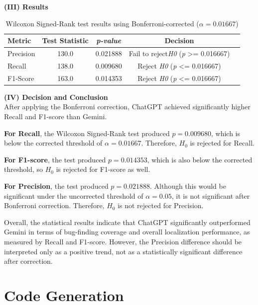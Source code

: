 \documentclass[11pt,a4paper]{article}
\begin{document}
    \textbf{(III) Results}\\

     \begin{table}[h]
        \centering
        \begin{tabular}{lcccc}
        \hline
        \textbf{Metric} & \textbf{Test Statistic} & \textbf{\textit{p-value}} & \textbf{Decision}\\
        \hline
        Precision &  130.0 &  0.021888  & Fail to reject\textit{H0} (\textit{p} >= 0.016667)\\
        Recall &  138.0 & 0.009680 & Reject \textit{H0} (\textit{p} <= 0.016667)\\
        F1-Score & 163.0 & 0.014353 & Reject \textit{H0} (\textit{p} <= 0.016667)\\
        \hline
        \end{tabular}
        \caption{ Wilcoxon Signed-Rank test results using Bonferroni-corrected ($\alpha = 0.01667$)}
        \label{tab:runtime-stats}
    \end{table}
    
    \textbf{(IV) Decision and Conclusion}\\
    After applying the Bonferroni correction, ChatGPT achieved significantly higher Recall and F1-score than Gemini. 
    
    \textbf{For Recall}, the Wilcoxon Signed-Rank test produced $p = 0.009680$, which is below the corrected threshold of $\alpha = 0.01667$. Therefore, $H_0$ is rejected for Recall.

    \textbf{For F1-score}, the test produced $p = 0.014353$, which is also below the corrected threshold, so $H_0$ is rejected for F1-score as well.
    
    \textbf{For Precision}, the test produced $p = 0.021888$. Although this would be significant under the uncorrected threshold of $\alpha = 0.05$, it is not significant after Bonferroni correction. Therefore, $H_0$ is not rejected for Precision.
    
    Overall, the statistical results indicate that ChatGPT significantly outperformed Gemini in terms of bug-finding coverage and overall localization performance, as measured by Recall and F1-score. However, the Precision difference should be interpreted only as a positive trend, not as a statistically significant difference after correction.
    
       \newpage{}
   \section{Code Generation}
\end{document}
